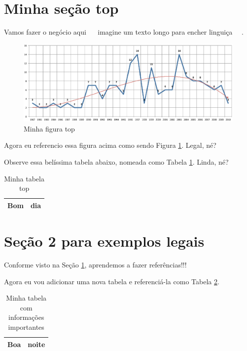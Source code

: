 \documentclass{article}
\begin{document}

\section{Minha seção top} \label{sec:top}
  Vamos fazer o negócio aqui ~~ imagine um texto longo para encher linguiça ~~.

  \begin{figure}[h]
    \includegraphics[scale=0.5]{abntex2-modelo-img-grafico}
    \caption{Minha figura top}
    \label{fig:top}
  \end{figure}

  Agora eu referencio essa figura acima como sendo Figura \ref{fig:top}. Legal, né?

  Observe essa belíssima tabela abaixo, nomeada como Tabela \ref{tab:top}. Linda, né?
  \begin{table}[h]
    \centering
    \begin{tabular}{| l | l |}
      \hline
      Bom & dia \\
      \hline
    \end{tabular}
    \label{tab:top}
    \caption{Minha tabela top}
  \end{table}

  \section{Seção 2 para exemplos legais}

  Conforme visto na Seção \ref{sec:top}, aprendemos a fazer referências!!!

  Agora eu vou adicionar uma nova tabela e referenciá-la como Tabela \ref{tab:informacao-importante}.

  \begin{table}[h]
	\centering
	\begin{tabular}{| l | l |}
		\hline
		Boa & noite \\
		\hline
	\end{tabular}
	\label{tab:informacao-importante}
	\caption{Minha tabela com informações importantes}
\end{table}
\end{document}
